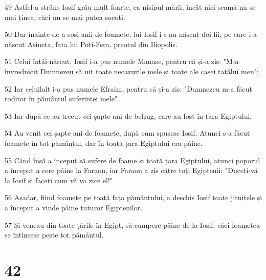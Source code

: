 \par 49 Astfel a strâns Iosif grâu mult foarte, ca nisipul mării, încât nici seamă nu se mai ținea, căci nu se mai putea socoti.
\par 50 Dar înainte de a sosi anii de foamete, lui Iosif i s-au născut doi fii, pe care i-a născut Asineta, fata lui Poti-Fera, preotul din Iliopolis.
\par 51 Celui întâi-născut, Iosif i-a pus numele Manase, pentru că și-a zis: "M-a învrednicit Dumnezeu să uit toate necazurile mele și toate ale casei tatălui meu";
\par 52 Iar celuilalt i-a pus numele Efraim, pentru că și-a zis: "Dumnezeu m-a făcut roditor în pământul suferinței mele".
\par 53 Iar după ce au trecut cei șapte ani de belșug, care au fost în țara Egiptului,
\par 54 Au venit cei șapte ani de foamete, după cum spusese Iosif. Atunci s-a făcut foamete în tot pământul, dar în toată țara Egiptului era pâine.
\par 55 Când însă a început să sufere de foame și toată țara Egiptului, atunci poporul a început a cere pâine la Faraon, iar Faraon a zis către toți Egiptenii: "Duceți-vă la Iosif și faceți cum vă va zice el!"
\par 56 Așadar, fiind foamete pe toată fața pământului, a deschis Iosif toate jitnițele și a început a vinde pâine tuturor Egiptenilor.
\par 57 Și veneau din toate țările în Egipt, să cumpere pâine de la Iosif, căci foametea se întinsese peste tot pământul.

\chapter{42}

